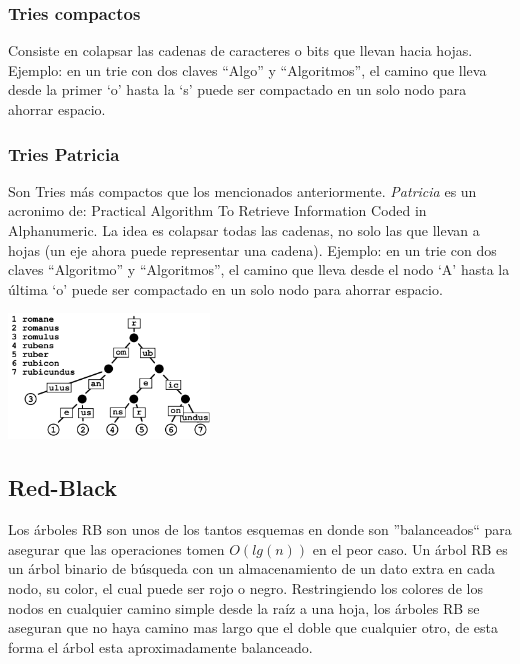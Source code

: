 \subsubsection{Tries compactos}
Consiste en colapsar las cadenas de caracteres o bits que llevan hacia hojas.
Ejemplo: en un trie con dos claves ``Algo'' y ``Algoritmos'', el camino que lleva desde la primer `o' hasta la `s' puede ser compactado en un solo nodo para ahorrar espacio.
\subsubsection{Tries Patricia}
Son Tries m\'as compactos que los mencionados anteriormente. \textit{Patricia} es un acronimo de: Practical Algorithm To Retrieve Information Coded in Alphanumeric.
La idea es colapsar todas las cadenas, no solo las que llevan a hojas (un eje ahora puede representar una cadena). 
Ejemplo: en un trie con dos claves ``Algoritmo'' y ``Algoritmos'', el camino que lleva desde el nodo `A' hasta la \'ultima `o' puede ser compactado en un solo nodo para ahorrar espacio.

\begin{center}
 \includegraphics[width=0.4\textwidth, height=0.4\textwidth]{./graficos/trie-patricia.png}
\end{center}

\subsection{Red-Black}

Los \'arboles RB son unos de los tantos esquemas en donde son ''balanceados`` para asegurar que las operaciones tomen $O(lg(n))$ en el peor caso. Un \'arbol RB es un \'arbol binario de b\'usqueda con un almacenamiento de un dato extra en cada nodo, su color, el cual puede ser rojo o negro. Restringiendo los colores de los nodos en cualquier camino simple desde la ra\'iz a una hoja, los \'arboles RB se aseguran que no haya camino mas largo que el doble que cualquier otro, de esta forma el \'arbol esta aproximadamente balanceado.

